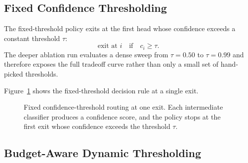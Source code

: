 \documentclass[10pt,twocolumn]{article}
\begin{document}
\subsection{Fixed Confidence Thresholding}

The fixed-threshold policy exits at the first head whose confidence exceeds a constant threshold $\tau$:
\begin{equation}
    \text{exit at } i \quad \text{if} \quad c_i \geq \tau.
\end{equation}
The deeper ablation run evaluates a dense sweep from $\tau = 0.50$ to $\tau = 0.99$ and therefore exposes the full tradeoff curve rather than only a small set of hand-picked thresholds.

Figure~\ref{fig:fixed-routing} shows the fixed-threshold decision rule at a single exit.

\begin{figure}[!tbp]
    \centering
    \caption{Fixed confidence-threshold routing at one exit. Each intermediate classifier produces a confidence score, and the policy stops at the first exit whose confidence exceeds the threshold $\tau$.}
    \label{fig:fixed-routing}
\end{figure}

\subsection{Budget-Aware Dynamic Thresholding}
\end{document}
